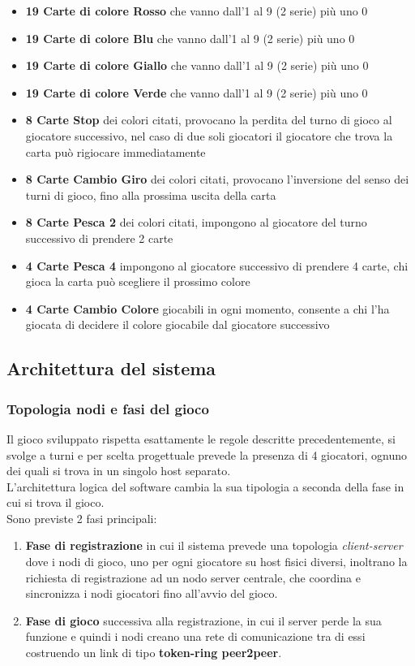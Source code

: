 \documentclass[10pt,a4paper]{article}
\begin{document}
\begin{itemize}
\item \textbf{19 Carte di colore Rosso} che vanno dall'1 al 9 (2 serie) più uno 0
\item \textbf{19 Carte di colore Blu} che vanno dall'1 al 9 (2 serie) più uno 0
\item \textbf{19 Carte di colore Giallo} che vanno dall'1 al 9 (2 serie) più uno 0
\item \textbf{19 Carte di colore Verde} che vanno dall'1 al 9 (2 serie) più uno 0

\item \textbf{8  Carte Stop} dei colori citati, provocano la perdita del turno di gioco al giocatore successivo, nel caso di due soli giocatori il giocatore che trova la carta può rigiocare immediatamente
\item \textbf{8  Carte Cambio Giro} dei colori citati, provocano l'inversione del senso dei turni di gioco, fino alla prossima uscita della carta
\item \textbf{8  Carte Pesca 2} dei colori citati, impongono al giocatore del turno successivo di prendere 2 carte

\item \textbf{4 Carte Pesca 4} impongono al giocatore successivo di prendere 4 carte, chi gioca la carta può scegliere il prossimo colore
\item \textbf{4 Carte Cambio Colore} giocabili in ogni momento, consente a chi l'ha giocata di decidere il colore giocabile dal giocatore successivo
\end{itemize}


\subsection{Architettura del sistema}

\subsubsection{Topologia nodi e fasi del gioco}
Il gioco sviluppato rispetta esattamente le regole descritte precedentemente, si svolge a turni e per scelta progettuale prevede la presenza di 4 giocatori, ognuno dei quali si trova in un singolo host separato.\\ L'architettura logica del software cambia la sua tipologia a seconda della fase in cui si trova il gioco.\\ Sono previste 2 fasi principali: 

\begin{enumerate}
\item\textbf{Fase di registrazione} in cui il sistema prevede una topologia \textit{client-server} dove i nodi di gioco, uno per ogni giocatore su host fisici diversi, inoltrano la richiesta di registrazione ad un nodo server centrale, che coordina e sincronizza i nodi giocatori fino all'avvio del gioco.

\item\textbf{Fase di gioco} successiva alla registrazione, in cui il server perde la sua funzione e quindi i nodi creano una rete di comunicazione tra di essi costruendo un link di tipo \textbf{token-ring peer2peer}.
\end{enumerate}
 
\end{document}
